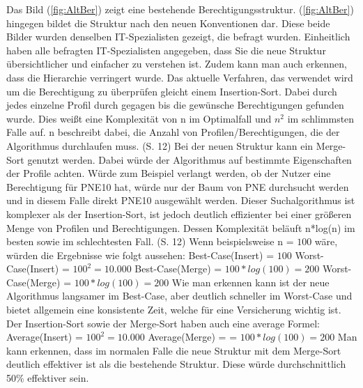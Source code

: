 \newpage
Das Bild (\ref{fig:AltBer}) zeigt eine bestehende Berechtigungsstruktur.
(\ref{fig:AltBer}) hingegen bildet die Struktur nach den neuen Konventionen dar.
Diese beide Bilder wurden denselben IT-Spezialisten gezeigt, die befragt wurden.
Einheitlich haben alle befragten IT-Spezialisten angegeben, dass Sie die neue Struktur übersichtlicher und einfacher zu verstehen ist.
Zudem kann man auch erkennen, dass die Hierarchie verringert wurde.
\newline
Das aktuelle Verfahren, das verwendet wird um die Berechtigung zu überprüfen gleicht einem Insertion-Sort.
Dabei durch jedes einzelne Profil durch gegagen bis die gewünsche Berechtigungen gefunden wurde.
Dies weißt eine Komplexität von n im Optimalfall und $n^2$ im schlimmsten Falle auf.
n beschreibt dabei, die Anzahl von Profilen/Berechtigungen, die der Algorithmus durchlaufen muss. \cite{weblogIn,log} (S. 12)
\newline
Bei der neuen Struktur kann ein Merge-Sort genutzt werden.
Dabei würde der Algorithmus auf bestimmte Eigenschaften der Profile achten.
Würde zum Beispiel verlangt werden, ob der Nutzer eine Berechtigung für PNE10 hat, würde nur der Baum von PNE durchsucht werden und in diesem Falle direkt PNE10 ausgewählt werden.
Dieser Suchalgorithmus ist komplexer als der Insertion-Sort, ist jedoch deutlich effizienter bei einer größeren Menge von Profilen und Berechtigungen.
Dessen Komplexität beläuft n*log(n) im besten sowie im schlechtesten Fall. \cite{weblogMer,log} (S. 12)
\newline
Wenn beispielsweise n = $100$ wäre, würden die Ergebnisse wie folgt aussehen:
\newline
\newline
Best-Case(Insert) = $100$
\newline
Worst-Case(Insert) = $100^2 = 10.000$
\newline
\newline
Best-Case(Merge) = $100*log(100) = 200$
\newline
Worst-Case(Merge) = $100*log(100) = 200$
\newline
\newline
Wie man erkennen kann ist der neue Algorithmus langsamer im Best-Case, aber deutlich schneller im Worst-Case und bietet allgemein eine konsistente Zeit, welche für eine Versicherung wichtig ist.
Der Insertion-Sort sowie der Merge-Sort haben auch eine average Formel: \cite{weblogMer,weblogIn}
\newline
\newline
Average(Insert) = $100^2 = 10.000$
\newline
\newline
Average(Merge) = = $100*log(100) = 200$
\newline
\newline
Man kann erkennen, dass im normalen Falle die neue Struktur mit dem Merge-Sort deutlich effektiver ist als die bestehende Struktur.
Diese würde durchschnittlich 50\% effektiver sein.

